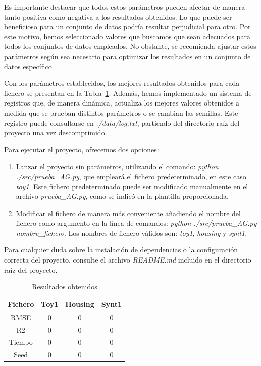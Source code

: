 \documentclass[conference,a4paper]{IEEEtran}
\begin{document}
Es importante destacar que todos estos parámetros pueden afectar de manera tanto positiva como negativa a los resultados obtenidos. Lo que puede ser beneficioso para un conjunto de datos podría resultar perjudicial para otro. Por este motivo, hemos seleccionado valores que buscamos que sean adecuados para todos los conjuntos de datos empleados. No obstante, se recomienda ajustar estos parámetros según sea necesario para optimizar los resultados en un conjunto de datos específico.

Con los parámetros establecidos, los mejores resultados obtenidos para cada fichero se presentan en la Tabla~\ref{tab:resultados}. Además, hemos implementado un sistema de registros que, de manera dinámica, actualiza los mejores valores obtenidos a medida que se prueban distintos parámetros o se cambian las semillas. Este registro puede consultarse en \textit{./data/log.txt}, partiendo del directorio raíz del proyecto una vez descomprimido.

Para ejecutar el proyecto, ofrecemos dos opciones: 
\begin{enumerate}
    \item Lanzar el proyecto sin parámetros, utilizando el comando: \textit{python ./src/prueba\_AG.py}, que empleará el fichero predeterminado, en este caso \textit{toy1}. Este fichero predeterminado puede ser modificado manualmente en el archivo \textit{prueba\_AG.py}, como se indicó en la plantilla proporcionada.

    \item Modificar el fichero de manera más conveniente añadiendo el nombre del fichero como argumento en la línea de comandos: \textit{python ./src/prueba\_AG.py nombre\_fichero}. Los nombres de fichero válidos son: \textit{toy1}, \textit{housing} y \textit{synt1}.
\end{enumerate}


Para cualquier duda sobre la instalación de dependencias o la configuración correcta del proyecto, consulte el archivo \textit{README.md} incluido en el directorio raíz del proyecto.

\begin{table} [h]
  \caption{Resultados obtenidos}
  \label{tab:resultados}
  \centering
  \begin{tabular}{cccc}
    \toprule
     Fichero & Toy1 & Housing & Synt1 \\
    \midrule
    RMSE & 0 & 0 & 0 \\
    R2 & 0 & 0 & 0 \\
    \midrule
    Tiempo & 0 & 0 & 0 \\
    Seed & 0 & 0 & 0 \\
    \bottomrule
  \end{tabular}
\end{table}
\end{document}
